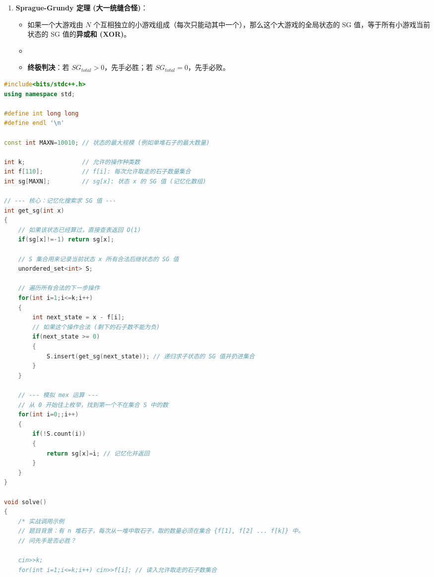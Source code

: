 \documentclass[10pt,landscape,a4paper]{article}
\newcommand{\NotebookMath}[1]{%
  \par\begingroup
  \sbox{\NotebookMathBox}{$\displaystyle #1$}%
  \noindent\makebox[\linewidth][c]{%
    \ifdim\wd\NotebookMathBox>\linewidth
      \resizebox{\linewidth}{!}{\usebox{\NotebookMathBox}}%
    \else\usebox{\NotebookMathBox}\fi}%
  \par\endgroup}
\begin{document}
\begin{multicols*}{3}
\begin{enumerate}[start=1]
\begin{itemize}
\end{itemize}
\item \textbf{Sprague-Grundy 定理 (大一统缝合怪)}：
\begin{itemize}
\item 如果一个大游戏由 $N$ 个互相独立的小游戏组成（每次只能动其中一个），那么这个大游戏的全局状态的 SG 值，等于所有小游戏当前状态的 SG 值的\textbf{异或和 (XOR)}。
\item 
\NotebookMath{SG_{total} = SG(x_1) \oplus SG(x_2) \oplus \dots \oplus SG(x_n)}
\item \textbf{终极判决}：若 $SG_{total} > 0$，先手必胜；若 $SG_{total} = 0$，先手必败。
\end{itemize}
\end{enumerate}
\par{}\par
\begin{lstlisting}[language=C++]
#include<bits/stdc++.h>
using namespace std;

#define int long long
#define endl '\n'

const int MAXN=10010; // 状态的最大规模 (例如单堆石子的最大数量)

int k;                // 允许的操作种类数
int f[110];           // f[i]: 每次允许取走的石子数量集合
int sg[MAXN];         // sg[x]: 状态 x 的 SG 值 (记忆化数组)

// --- 核心：记忆化搜索求 SG 值 ---
int get_sg(int x)
{
    // 如果该状态已经算过，直接查表返回 O(1)
    if(sg[x]!=-1) return sg[x];
    
    // S 集合用来记录当前状态 x 所有合法后继状态的 SG 值
    unordered_set<int> S; 
    
    // 遍历所有合法的下一步操作
    for(int i=1;i<=k;i++)
    {
        int next_state = x - f[i];
        // 如果这个操作合法 (剩下的石子数不能为负)
        if(next_state >= 0) 
        {
            S.insert(get_sg(next_state)); // 递归求子状态的 SG 值并扔进集合
        }
    }
    
    // --- 模拟 mex 运算 ---
    // 从 0 开始往上枚举，找到第一个不在集合 S 中的数
    for(int i=0;;i++)
    {
        if(!S.count(i))
        {
            return sg[x]=i; // 记忆化并返回
        }
    }
}

void solve()
{
    /* 实战调用示例
    // 题目背景：有 n 堆石子，每次从一堆中取石子，取的数量必须在集合 {f[1], f[2] ... f[k]} 中。
    // 问先手是否必胜？
    
    cin>>k;
    for(int i=1;i<=k;i++) cin>>f[i]; // 读入允许取走的石子数集合
    

\end{lstlisting}
\end{multicols*}
\end{document}
